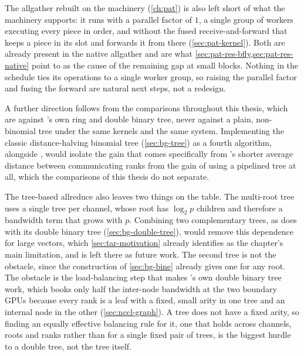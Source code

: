 The allgather rebuilt on the \pat{} machinery (\cref{ch:pat}) is also left short of what the machinery supports: it runs with a parallel factor of $1$, a single group of workers executing every piece in order, and without the fused receive-and-forward that keeps a piece in its slot and forwards it from there (\cref{sec:pat-kernel}).
Both are already present in the native \pat{} allgather and are what \cref{sec:pat-res-bfly,sec:pat-res-native} point to as the cause of the remaining gap at small blocks. Nothing in the \bine{} schedule ties its operations to a single worker group, so raising the parallel factor and fusing the forward are natural next steps, not a redesign.

A further direction follows from the comparisons throughout this thesis, which are against \nccl{}'s own ring and double binary tree, never against a plain, non-\bine{} binomial tree under the same kernels and the same system.
Implementing the classic distance-halving binomial tree (\cref{sec:bg-tree}) as a fourth \nccl{} algorithm, alongside \bine{}, would isolate the gain that comes specifically from \bine{}'s shorter average distance between communicating ranks from the gain of using a pipelined tree at all, which the comparisons of this thesis do not separate.

The tree-based allreduce also leaves two things on the table.
The multi-root tree uses a single \bine{} tree per channel, whose root has $\log_2p$ children and therefore a bandwidth term that grows with $p$. Combining two complementary trees, as \nccl{} does with its double binary tree (\cref{sec:bg-double-tree}), would remove this dependence for large vectors, which \cref{sec:tar-motivation} already identifies as the chapter's main limitation, and is left there as future work.
The second tree is not the obstacle, since the construction of \cref{sec:bg-bine} already gives one for any root. The obstacle is the load-balancing step that makes \nccl{}'s own double binary tree work, which books only half the inter-node bandwidth at the two boundary GPUs because every rank is a leaf with a fixed, small arity in one tree and an internal node in the other (\cref{sec:nccl-graph}).
A \bine{} tree does not have a fixed arity, so finding an equally effective balancing rule for it, one that holds across channels, roots and ranks rather than for a single fixed pair of trees, is the biggest hurdle to a \bine{} double tree, not the tree itself.

